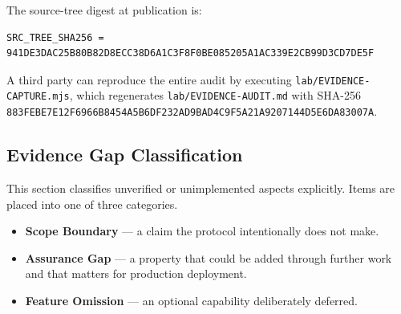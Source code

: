 \documentclass[11pt,a4paper]{article}
\begin{document}
The source-tree digest at publication is:

\begin{lstlisting}
SRC_TREE_SHA256 = 941DE3DAC25B80B82D8ECC38D6A1C3F8F0BE085205A1AC339E2CB99D3CD7DE5F
\end{lstlisting}

A third party can reproduce the entire audit by executing \texttt{lab/EVIDENCE-CAPTURE.mjs}, which regenerates \texttt{lab/EVIDENCE-AUDIT.md} with SHA-256 \texttt{883FEBE7E12F6966B8454A5B6DF232AD9BAD4C9F5A21A9207144D5E6DA83007A}.

\subsection{Evidence Gap Classification}

This section classifies unverified or unimplemented aspects explicitly. Items are placed into one of three categories.

\begin{itemize}
\item \textbf{Scope Boundary} --- a claim the protocol intentionally does not make.
\item \textbf{Assurance Gap} --- a property that could be added through further work and that matters for production deployment.
\item \textbf{Feature Omission} --- an optional capability deliberately deferred.
\end{itemize}
\end{document}
